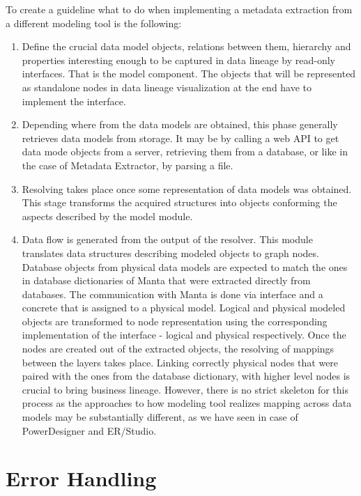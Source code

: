 To create a guideline what to do when implementing a metadata extraction from a different modeling tool is the following:

\begin{enumerate}
	\item Define the crucial data model objects, relations between them, hierarchy and properties interesting enough to be captured in data lineage by read-only interfaces. That is the model component. 
	The objects that will be represented as standalone nodes in data lineage visualization at the end have to implement the  interface.
	\item Depending where from the data models are obtained, this phase generally retrieves data models from storage. It may be by calling a web API to get data mode objects from a server, retrieving them from a database, or like in the case of Metadata Extractor, by parsing a file.
	\item Resolving takes place once some representation of data models was obtained. This stage transforms the acquired structures into objects conforming the aspects described by the model module.
	\item Data flow is generated from the output of the resolver. This module translates data structures describing modeled objects to graph nodes. 
	Database objects from physical data models are expected to match the ones in database dictionaries of Manta that were extracted directly from databases. 
	The communication with Manta is done via  interface and a concrete  that is assigned to a physical model.
	Logical and physical modeled objects are transformed to node representation using the corresponding implementation of the  interface - logical and physical respectively.
	Once the nodes are created out of the extracted objects, the resolving of mappings between the layers takes place.
	Linking correctly physical nodes that were paired with the ones from the database dictionary, with higher level nodes is crucial to bring business lineage. 
	However, there is no strict skeleton for this process as the approaches to how modeling tool realizes mapping across data models may be substantially different, as we have seen in case of PowerDesigner and ER/Studio.
\end{enumerate} 

\section{Error Handling}

